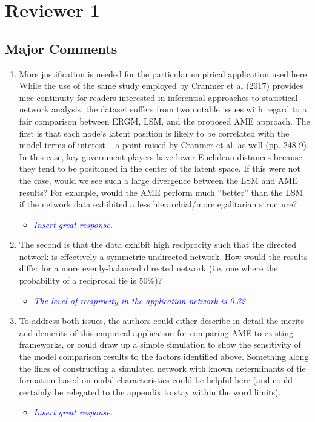 \section{Reviewer 1}

\subsection{Major Comments}

\begin{enumerate}
	\item  More justification is needed for the particular empirical application used here. While the use of the same study employed by Cranmer et al (2017) provides nice continuity for readers interested in inferential approaches to statistical network analysis, the dataset suffers from two notable issues with regard to a fair comparison between ERGM, LSM, and the proposed AME approach. The first is that each node’s latent position is likely to be correlated with the model terms of interest – a point raised by Cranmer et al. as well (pp. 248-9). In this case, key government players have lower Euclidean distances because they tend to be positioned in the center of the latent space. If this were not the case, would we see such a large divergence between the LSM and AME results? For example, would the AME perform much ``better'' than the LSM if the network data exhibited a less hierarchial/more egalitarian structure? 
	\begin{itemize}
		\item \textcolor{blue}{ \emph{
		Insert great response.
		}}
	\end{itemize}
	\item The second is that the data exhibit high reciprocity such that the directed network is effectively a symmetric undirected network. How would the results differ for a more evenly-balanced directed network (i.e. one where the probability of a reciprocal tie is 50\%)? 
	\begin{itemize}
		\item \textcolor{blue}{ \emph{
		The level of reciprocity in the application network is 0.32. 
		}}
	\end{itemize}
	\item To address both issues, the authors could either describe in detail the merits and demerits of this empirical application for comparing AME to existing frameworks, or could draw up a simple simulation to show the sensitivity of the model comparison results to the factors identified above. Something along the lines of constructing a simulated network with known determinants of tie formation based on nodal characteristics could be helpful here (and could certainly be relegated to the appendix to stay within the word limits). 
	\begin{itemize}
		\item \textcolor{blue}{ \emph{
		Insert great response.
		}}
	\end{itemize}	
\end{enumerate}

